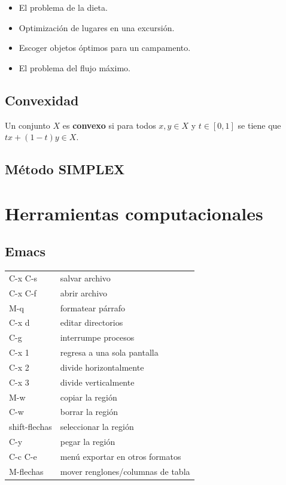 \documentclass[11pt]{article}
\begin{document}
\begin{itemize}
\item El problema de la dieta.
\item Optimización de lugares en una excursión.
\item Escoger objetos óptimos para un campamento.
\item El problema del flujo máximo.
\end{itemize}

\subsection{Convexidad}
\label{sec:orgdcf9949}

Un conjunto \(X\) es \textbf{convexo} si para todos \(x,y\in X\) y
\(t\in[0,1]\) se tiene que \(tx + (1-t)y \in X\).
\subsection{Método SIMPLEX}
\label{sec:org3a7334c}

\section{Herramientas computacionales}
\label{sec:org4fb862c}
\subsection{Emacs}
\label{sec:org21464a9}

\begin{center}
\begin{tabular}{ll}
C-x C-s & salvar archivo\\
C-x C-f & abrir archivo\\
M-q & formatear párrafo\\
C-x d & editar directorios\\
C-g & interrumpe procesos\\
C-x 1 & regresa a una sola pantalla\\
C-x 2 & divide horizontalmente\\
C-x 3 & divide verticalmente\\
M-w & copiar la región\\
C-w & borrar la región\\
shift-flechas & seleccionar la región\\
C-y & pegar la región\\
C-c C-e & menú exportar en otros formatos\\
M-flechas & mover renglones/columnas de tabla\\
\end{tabular}
\end{center}
\end{document}

